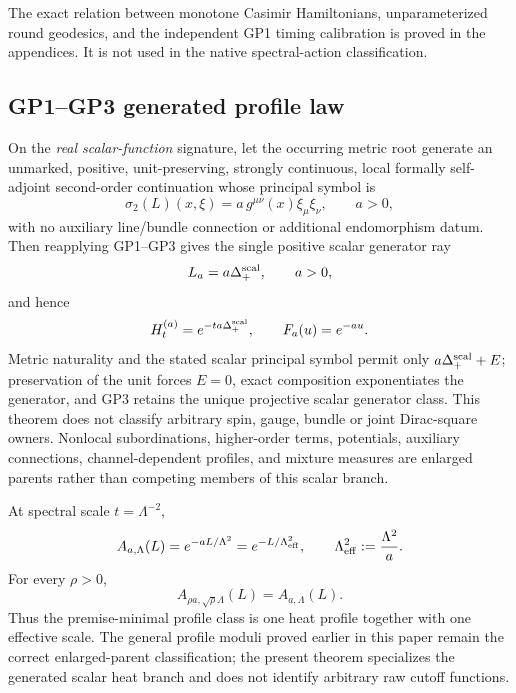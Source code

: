 \documentclass[12pt,a4paper]{article}
\begin{document}
\begin{remark}
The exact relation between monotone Casimir Hamiltonians, unparameterized
round geodesics, and the independent GP1 timing calibration is proved in the
appendices.  It is not used in the native spectral-action classification.
\end{remark}


\subsection{GP1--GP3 generated profile law}
\label{p3b:sec:v164-generated-profile-law}

\begin{theorem}
\label{p3b:thm:v164-generated-heat-profile}
On the \emph{real scalar-function} signature, let the occurring metric root
generate an unmarked, positive, unit-preserving, strongly continuous, local
formally self-adjoint second-order continuation whose principal symbol is
\[
 \sigma_2(L)(x,\xi)=a\,g^{\mu\nu}(x)\xi_\mu\xi_\nu,
 \qquad a>0,
\]
with no auxiliary line/bundle connection or additional endomorphism datum.
Then reapplying GP1--GP3 gives the single positive scalar generator ray
\[
 L_a=a\Delta_+^{\rm scal},\qquad a>0,
\]
and hence
\[
 H_t^{(a)}=e^{-ta\Delta_+^{\rm scal}},
 \qquad F_a(u)=e^{-au}.
\]
Metric naturality and the stated scalar principal symbol permit only
\(a\Delta_+^{\rm scal}+E\); preservation of the unit forces \(E=0\), exact
composition exponentiates the generator, and GP3 retains the unique
projective scalar generator class.  This theorem does not classify arbitrary
spin, gauge, bundle or joint Dirac-square owners.  Nonlocal subordinations,
higher-order terms, potentials, auxiliary connections, channel-dependent
profiles, and mixture measures are enlarged parents rather than competing
members of this scalar branch.
\end{theorem}

\begin{corollary}
\label{p3b:cor:v164-profile-scale-orbit}
At spectral scale \(t=\Lambda^{-2}\),
\[
 A_{a,\Lambda}(L)=e^{-aL/\Lambda^2}
 =e^{-L/\Lambda_{\rm eff}^2},
 \qquad
 \Lambda_{\rm eff}^2:=\frac{\Lambda^2}{a}.
\]
For every \(\rho>0\),
\[
 A_{\rho a,\sqrt\rho\Lambda}(L)=A_{a,\Lambda}(L).
\]
Thus the premise-minimal profile class is one heat profile together with one
effective scale.  The general profile moduli proved earlier in this paper
remain the correct enlarged-parent classification; the present theorem
specializes the generated scalar heat branch and does not identify arbitrary
raw cutoff functions.
\end{corollary}
\end{document}
